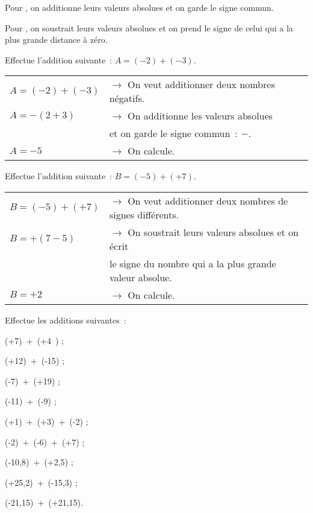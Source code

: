 

\begin{methode*1}

\begin{aconnaitre}
Pour , on additionne leurs valeurs absolues et on garde le signe commun.

Pour , on soustrait leurs valeurs absolues et on prend le signe de celui qui a la plus grande distance à zéro.
\end{aconnaitre}

\begin{exemple*1}
Effectue l'addition suivante : $A = (-2) + (-3)$.
\begin{tabular}{ll} 
$A = (-2) + (-3)$ & $\rightarrow$ On veut additionner deux nombres négatifs. \\
$A = -(2 + 3)$ & $\rightarrow$ On additionne les valeurs absolues \\
 & \phantom{$\rightarrow$} et on garde le signe commun : $-$. \\
$A = -5$ & $\rightarrow$ On calcule. \\
\end{tabular}
 \end{exemple*1}
 
 \begin{exemple*1}
Effectue l'addition suivante : $B = (-5) + (+7)$.
\begin{tabular}{ll} 
$B = (-5) + (+7)$ & $\rightarrow$ On veut additionner deux nombres de signes différents. \\
$B = +(7 - 5)$ & $\rightarrow$ On soustrait leurs valeurs absolues et on écrit \\
 & \phantom{$\rightarrow$} le signe du nombre qui a la plus grande valeur absolue. \\
$B = +2$ & $\rightarrow$ On calcule. \\
\end{tabular}
 \end{exemple*1}
 
 \exercice  
Effectue les additions suivantes :
\begin{colenumerate}{3}
 \item (+7) + (+4 ) ;
 \item (+12) + (-15) ;
 \item (-7) + (+19) ;
 \item (-11) + (-9) ;
 \item (+1) + (+3) + (-2) ;
 \item (-2) + (-6) + (+7) ;
 \item (-10,8) + (+2,5) ;
 \item (+25,2) + (-15,3) ;
 \item (-21,15) + (+21,15).
 \end{colenumerate}


\end{methode*1}
